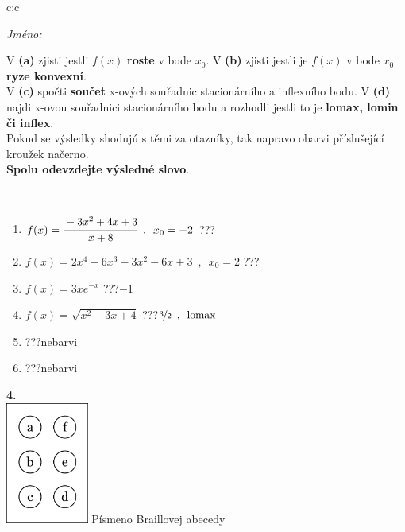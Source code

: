 \documentclass[10pt]{report}
\begin{document}
\begin{tabular}{c:c}
\begin{minipage}[c][104.5mm][t]{0.5\linewidth}
\begin{center}
\textit{Jméno:}\phantom{xxxxxxxxxxxxxxxxxxxxxxxxxxxxxxxxxxxxxxxxxxxxxxxxxxxxxxxxxxxxxxxxx}\\[5mm]
\begin{minipage}{0.95\linewidth}
\begin{center}
{\small V \textbf{(a)} zjisti jestli $f(x)$ \textbf{roste} v bode $x_0$. V \textbf{(b)} zjisti jestli je $f(x)$ v bode $x_0$ \textbf{ryze konvexní}.\\V \textbf{(c)} spočti \textbf{součet} x-ových souřadnic stacionárního a inflexního bodu. V \textbf{(d)} najdi x-ovou souřadnici stacionárního bodu a rozhodli jestli to je \textbf{lomax, lomin či inflex}.\\Pokud se výsledky shodujú s těmi za otazníky, tak napravo obarvi příslušející kroužek načerno.\\\textbf{Spolu odevzdejte výsledné slovo}}.
\end{center}
\end{minipage}
\\[1mm]
\begin{minipage}{0.79\linewidth}
\begin{center}
\begin{varwidth}{\linewidth}
\begin{enumerate}
\normalsize
\item $f(x)=\cfrac{-3x^2+4x+3}{x+8}\enspace , \enspace x_0=-2$\quad \dotfill\; ???\;\dotfill \quad {}
\item $f(x)=2x^4-6x^3-3x^2-6x+3\enspace , \enspace x_0=2$\quad \dotfill\; ???\;\dotfill \quad {}
\item $f(x)=3xe^{-x}$\quad \dotfill\; ???\;\dotfill \quad $-1$
\item $f(x)=\sqrt{x^2-3x+4}$\quad \dotfill\; ???\;\dotfill \quad $\nicefrac{3}{2}\enspace , \enspace\mathrm{lomax}$
\item \quad \dotfill\; ???\;\dotfill \quad nebarvi
\item \quad \dotfill\; ???\;\dotfill \quad nebarvi
\end{enumerate}
\end{varwidth}
\end{center}
\end{minipage}
\begin{minipage}{0.20\linewidth}
\begin{center}
{\Huge\bfseries 4.} \\[2mm]
\includegraphics[height=40mm]{../images/braille.png}
{\small Písmeno Braillovej abecedy}
\end{center}
\end{minipage}
\end{center}
\end{minipage}
%
\end{tabular}
\end{document}
